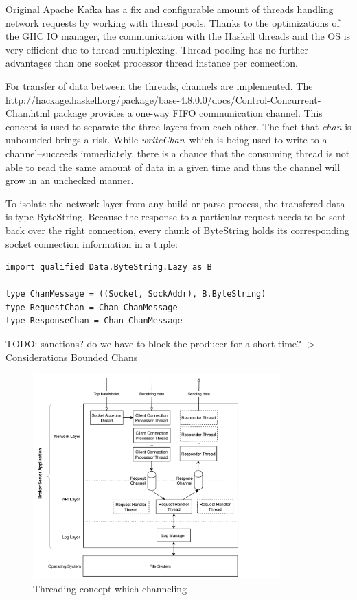 Original Apache Kafka has a fix and configurable amount of threads
handling network requests by working with thread pools. Thanks to the
optimizations of the GHC IO manager, the communication with the Haskell threads
and the OS is very efficient due to thread multiplexing. Thread pooling has no
further advantages than one socket processor thread instance per connection. 

For transfer of data between the threads, channels are implemented. The 
{http://hackage.haskell.org/package/base-4.8.0.0/docs/Control-Concurrent-Chan.html}
package provides a one-way FIFO communication channel. This concept
is used to separate the three layers from each other. The
fact that \textit{chan} is unbounded brings a risk. While \textit{writeChan}--which is being used to write to a channel--succeeds immediately, there is a
chance that the consuming thread is not able to read the same amount of data in
a given time and thus the channel will grow in an unchecked manner.
\cite{o2008real}

To isolate the network layer from any build or parse process, the transfered
data is type ByteString. Because the response to a particular request needs to be
sent back over the right connection, every chunk of ByteString holds its corresponding
socket connection information in a tuple:

\begin{lstlisting}[caption={Initialize channels for threading}]
import qualified Data.ByteString.Lazy as B

type ChanMessage = ((Socket, SockAddr), B.ByteString)
type RequestChan = Chan ChanMessage
type ResponseChan = Chan ChanMessage
\end{lstlisting}

TODO: sanctions? do we have to block the producer for a short time? ->
Considerations Bounded Chans

\begin{figure}[H]
    \centering
    \includegraphics[width=0.85\textwidth]{images/impl-brok-threading.png}
    \caption{Threading concept which channeling}
    \label{fig:impl-brok-threading}
\end{figure}

